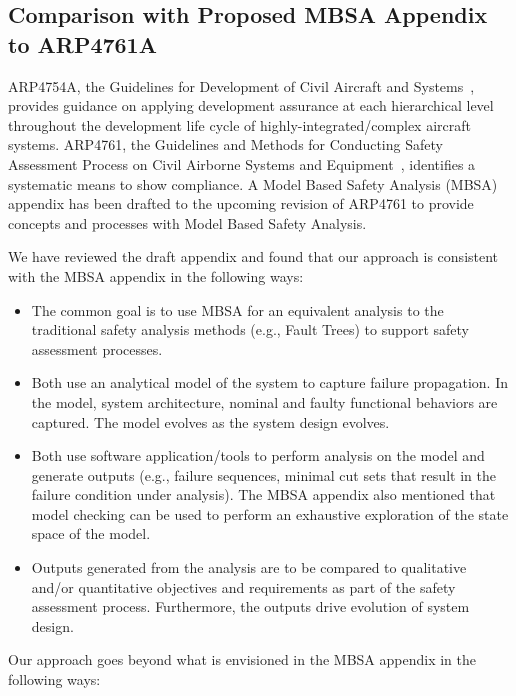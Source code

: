\subsection{Comparison with Proposed MBSA Appendix to ARP4761A}
\label{sec:mbsa_appendix_review}

ARP4754A, the Guidelines for Development of Civil Aircraft and Systems~\cite{SAE:ARP4754A}, provides guidance on applying development assurance at each hierarchical level throughout the development life cycle of highly-integrated/complex aircraft systems. ARP4761, the Guidelines and Methods for Conducting Safety Assessment Process on Civil Airborne Systems and Equipment~\cite{SAE:ARP4761},  identifies a systematic means to show compliance. A Model Based Safety Analysis (MBSA) appendix has been drafted to the upcoming revision of ARP4761 to provide concepts and processes with Model Based Safety Analysis.

We have reviewed the draft appendix and found that our approach is consistent with the MBSA appendix in the following ways:

\begin{itemize}
	\item The common goal is to use MBSA for an equivalent analysis to the traditional safety analysis methods (e.g., Fault Trees) to support safety assessment processes.
	\item Both use an analytical model of the system to capture failure propagation. In the model, system architecture, nominal and faulty functional behaviors are captured. The model evolves as the system design evolves.
	\item Both use software application/tools to perform analysis on the model and generate outputs (e.g., failure sequences, minimal cut sets that result in the failure condition under analysis). The MBSA appendix also mentioned that model checking can be used to perform an exhaustive exploration of the state space of the model.
	\item Outputs generated from the analysis are to be compared to qualitative and/or quantitative objectives and requirements as part of the safety assessment process. Furthermore, the outputs drive evolution of system design. 
\end{itemize}

Our approach goes beyond what is envisioned in the MBSA appendix in the following ways:

